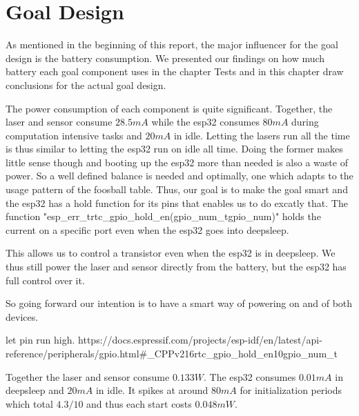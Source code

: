 \section{Goal Design}
As mentioned in the beginning of this report, the major influencer for the goal design is the battery consumption. We presented our findings on how much battery each goal component uses in the chapter Tests and in this chapter draw conclusions for the actual goal design.

The power consumption of each component is quite significant. Together, the laser  and sensor consume $28.5mA$ while the esp32 consumes $80mA$ during computation intensive tasks and $20mA$ in idle. Letting the lasers run all the time is thus similar to letting the esp32 run on idle all time. Doing the former makes little sense though and booting up the esp32 more than needed is also a waste of power. So a well defined balance is needed and optimally, one which adapts to the usage pattern of the foosball table.  Thus, our goal is to make the goal smart and the esp32 has a hold function for its pins that enables us to do excatly that. The function "esp_err_trtc_gpio_hold_en(gpio_num_tgpio_num)" holds the current on a specific port even when the esp32 goes into deepsleep\cite{GPIORTCG11esp32letPinsOn:online}.

This allows us to control a transistor even when the esp32 is in deepsleep. We thus still power the laser and sensor directly from the battery, but the esp32 has full control over it. 

So going forward our intention is to have a smart way of powering on and of both devices. 



let pin run high.
https://docs.espressif.com/projects/esp-idf/en/latest/api-reference/peripherals/gpio.html#_CPPv216rtc_gpio_hold_en10gpio_num_t




Together the laser and sensor consume $0.133W$. The esp32 consumes $0.01mA$ in deepsleep and $20mA$ in idle. It spikes at around $80mA$ for initialization periods which total $4.3/10$ and thus each start costs $0.048mW$.